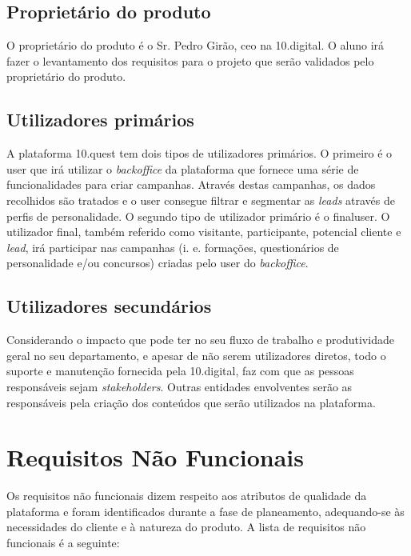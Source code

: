 \subsection{Proprietário do produto}

O proprietário do produto é o Sr. Pedro Girão, \acrshort{ceo} na 10.digital. O aluno irá fazer o levantamento dos requisitos para o projeto que serão validados pelo proprietário do produto.

\subsection{Utilizadores primários}

A plataforma 10.quest tem dois tipos de utilizadores primários. O primeiro é o \gls{user} que irá utilizar o \textit{backoffice} da plataforma que fornece uma série de funcionalidades para criar campanhas. Através destas campanhas, os dados recolhidos são tratados e o \gls{user} consegue filtrar e segmentar as \textit{leads} através de perfis de personalidade. O segundo tipo de utilizador primário é o \gls{finaluser}. O utilizador final, também referido como visitante, participante, potencial cliente e \textit{lead}, irá participar nas campanhas (i. e. formações, questionários de personalidade e/ou concursos) criadas pelo  \gls{user} do \textit{backoffice}.


\subsection{Utilizadores secundários}

Considerando o impacto que pode ter no seu fluxo de trabalho e produtividade geral no seu departamento, e apesar de não serem utilizadores diretos, todo o suporte e manutenção fornecida pela 10.digital, faz com que as pessoas responsáveis sejam \textit{stakeholders}.
Outras entidades envolventes serão as responsáveis pela criação dos conteúdos que serão utilizados na plataforma.


\section{Requisitos Não Funcionais}
\label{rnf}

Os requisitos não funcionais dizem respeito aos atributos de qualidade da plataforma e foram identificados durante a fase de planeamento, adequando-se às necessidades do cliente e à natureza do produto. A lista de requisitos não funcionais é a seguinte:

